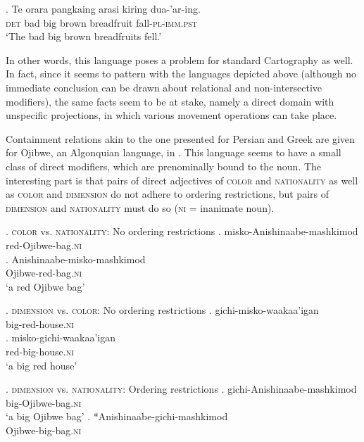 \exg. Te orara pangkaing arasi kiring dua-’ar-ing.\\
\textsc{det} bad big brown breadfruit fall-\textsc{pl-imm.pst}\\
`The bad big brown breadfruits fell.’ \\ \null \hfill \citep[429]{brown:2024:adj}

In other words, this language poses a problem for standard Cartography as well. In fact, since it seems to pattern with the languages depicted above (although no immediate conclusion can be drawn about relational and non-intersective modifiers), the same facts seem to be at stake, namely a direct domain with unspecific projections, in which various movement operations can take place.

Containment relations akin to the one presented for  Persian and  Greek are given for  Ojibwe, an Algonquian language, in \citet{rosen:2016:on}. This language seems to have a small class of direct modifiers, which are prenominally bound to the noun. The interesting part is that pairs of direct adjectives of \textsc{color} and \textsc{nationality} as well as \textsc{color} and \textsc{dimension} do not adhere to ordering restrictions, but pairs of \textsc{dimension} and \textsc{nationality} must do so (\textsc{ni} = inanimate noun).

\newpage
\ex. \textsc{color} vs. \textsc{nationality}: No ordering restrictions
\ag. misko-Anishinaabe-mashkimod\\
red-Ojibwe-bag.\textsc{ni}\\
\bg. Anishinaabe-misko-mashkimod\\
Ojibwe-red-bag.\textsc{ni}\\
`a red Ojibwe bag’ \null \hfill \citep[161]{rosen:2016:on}

\ex. \textsc{dimension} vs. \textsc{color}: No ordering restrictions
\ag. gichi-misko-waakaa’igan\\
big-red-house.\textsc{ni}\\
\bg. misko-gichi-waakaa’igan\\
red-big-house.\textsc{ni}\\
`a big red house’ \null \hfill \citep[161]{rosen:2016:on}

\ex. \textsc{dimension} vs. \textsc{nationality}: Ordering restrictions
\ag. gichi-Anishinaabe-mashkimod\\
big-Ojibwe-bag.\textsc{ni}\\
`a big Ojibwe bag’
\bg. *Anishinaabe-gichi-mashkimod\\
Ojibwe-big-bag.\textsc{ni} \\ \null \hfill \citep[162]{rosen:2016:on}

